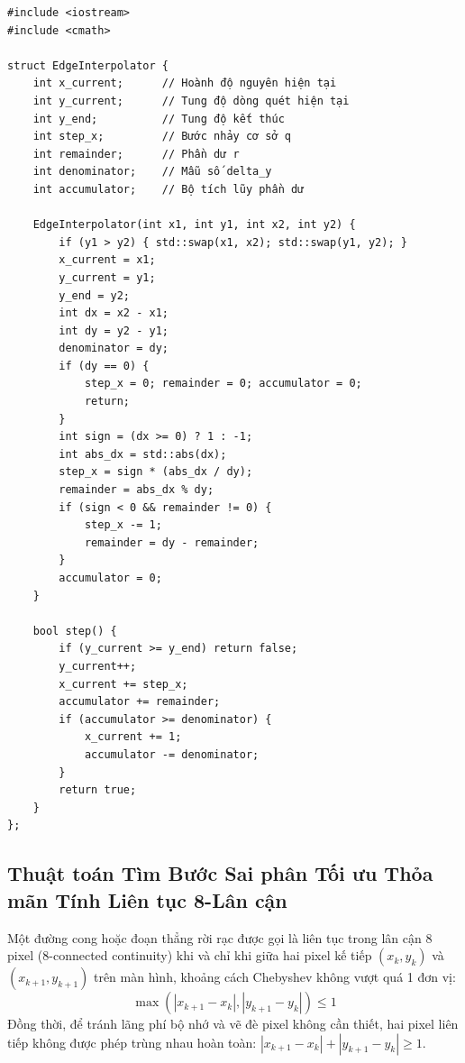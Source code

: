 \begin{verbatim}
#include <iostream>
#include <cmath>

struct EdgeInterpolator {
    int x_current;      // Hoành độ nguyên hiện tại
    int y_current;      // Tung độ dòng quét hiện tại
    int y_end;          // Tung độ kết thúc
    int step_x;         // Bước nhảy cơ sở q
    int remainder;      // Phần dư r
    int denominator;    // Mẫu số delta_y
    int accumulator;    // Bộ tích lũy phần dư

    EdgeInterpolator(int x1, int y1, int x2, int y2) {
        if (y1 > y2) { std::swap(x1, x2); std::swap(y1, y2); }
        x_current = x1;
        y_current = y1;
        y_end = y2;
        int dx = x2 - x1;
        int dy = y2 - y1;
        denominator = dy;
        if (dy == 0) {
            step_x = 0; remainder = 0; accumulator = 0;
            return;
        }
        int sign = (dx >= 0) ? 1 : -1;
        int abs_dx = std::abs(dx);
        step_x = sign * (abs_dx / dy);
        remainder = abs_dx % dy;
        if (sign < 0 && remainder != 0) {
            step_x -= 1;
            remainder = dy - remainder;
        }
        accumulator = 0;
    }

    bool step() {
        if (y_current >= y_end) return false;
        y_current++;
        x_current += step_x;
        accumulator += remainder;
        if (accumulator >= denominator) {
            x_current += 1;
            accumulator -= denominator;
        }
        return true;
    }
};
\end{verbatim}

\subsection{Thuật toán Tìm Bước Sai phân Tối ưu Thỏa mãn Tính Liên tục 8-Lân cận}
\label{subsec:continuity_8_neighborhood}

Một đường cong hoặc đoạn thẳng rời rạc được gọi là liên tục trong lân cận 8 pixel (8-connected continuity) khi và chỉ khi giữa hai pixel kế tiếp $(x_k, y_k)$ và $(x_{k+1}, y_{k+1})$ trên màn hình, khoảng cách Chebyshev không vượt quá 1 đơn vị:
\begin{equation}
\label{eq:chebyshev_8_connectivity}
\max\left( |x_{k+1} - x_k|, |y_{k+1} - y_k| \right) \le 1
\end{equation}
Đồng thời, để tránh lãng phí bộ nhớ và vẽ đè pixel không cần thiết, hai pixel liên tiếp không được phép trùng nhau hoàn toàn: $|x_{k+1} - x_k| + |y_{k+1} - y_k| \ge 1$.

